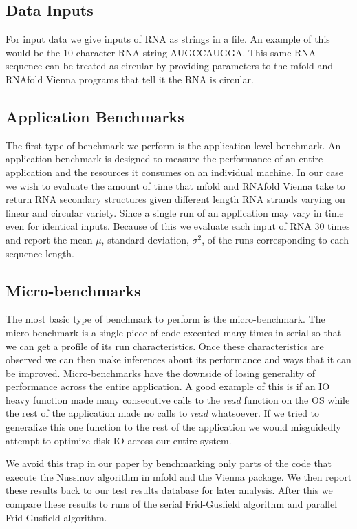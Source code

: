 \documentclass[12pt]{article}
\begin{document}
\subsection{Data Inputs}
\par For input data we give inputs of RNA as strings in a file. An example of this would be the 10 character RNA string AUGCCAUGGA. This same RNA sequence can be treated as circular by providing parameters to the mfold and RNAfold Vienna programs that tell it the RNA is circular\cite{mfold-manual, vienna-manual}.
\subsection{Application Benchmarks}
The first type of benchmark we perform is the application level benchmark. An application benchmark is designed to measure the performance of an entire application and the resources it consumes on an individual machine\cite{jain}. In our case we wish to evaluate the amount of time that mfold and RNAfold Vienna take to return RNA secondary structures given different length RNA strands varying on linear and circular variety. Since a single run of an application may vary in time even for identical inputs. Because of this we evaluate each input of RNA 30 times and report the mean $\mu$, standard deviation, $\sigma^2$, of the runs corresponding to each sequence length.

\subsection{Micro-benchmarks}
\par The most basic type of benchmark to perform is the micro-benchmark. The micro-benchmark is a single piece of code executed many times in serial so that we can get a profile of its run characteristics\cite{eulogy,sysperformance}. Once these characteristics are observed we can then make inferences about its performance and ways that it can be improved. Micro-benchmarks have the downside of losing generality of performance across the entire application\cite{eulogy, sysperformance}. A good example of this is if an IO heavy function made many consecutive calls to the \textit{read} function on the OS while the rest of the application made no calls to \textit{read} whatsoever. If we tried to generalize this one function to the rest of the application we would misguidedly attempt to optimize disk IO across our entire system.
\par We avoid this trap in our paper by benchmarking only parts of the code that execute the Nussinov algorithm in mfold and the Vienna package. We then report these results back to our test results database for later analysis. After this we compare these results to runs of the serial Frid-Gusfield algorithm and parallel Frid-Gusfield algorithm.
\end{document}
